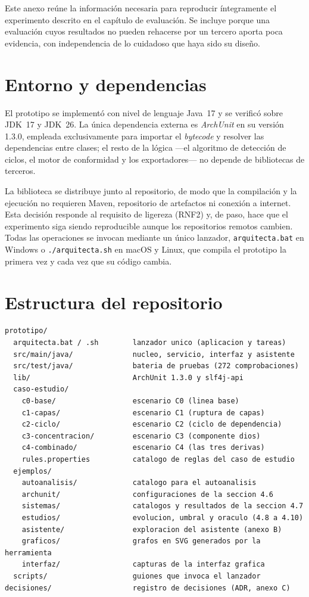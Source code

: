 \label{anexo:repro}

Este anexo reúne la información necesaria para reproducir íntegramente el experimento descrito en el capítulo de evaluación. Se incluye porque una evaluación cuyos resultados no pueden rehacerse por un tercero aporta poca evidencia, con independencia de lo cuidadoso que haya sido su diseño.

\section{Entorno y dependencias}
El prototipo se implementó con nivel de lenguaje Java~17 y se verificó sobre JDK~17 y JDK~26. La única dependencia externa es \textit{ArchUnit} en su versión 1.3.0, empleada exclusivamente para importar el \textit{bytecode} y resolver las dependencias entre clases; el resto de la lógica —el algoritmo de detección de ciclos, el motor de conformidad y los exportadores— no depende de bibliotecas de terceros.

La biblioteca se distribuye junto al repositorio, de modo que la compilación y la ejecución no requieren Maven, repositorio de artefactos ni conexión a internet. Esta decisión responde al requisito de ligereza (RNF2) y, de paso, hace que el experimento siga siendo reproducible aunque los repositorios remotos cambien. Todas las operaciones se invocan mediante un único lanzador, \texttt{arquitecta.bat} en Windows o \texttt{./arquitecta.sh} en macOS y Linux, que compila el prototipo la primera vez y cada vez que su código cambia.

\section{Estructura del repositorio}
\begin{verbatim}
prototipo/
  arquitecta.bat / .sh        lanzador unico (aplicacion y tareas)
  src/main/java/              nucleo, servicio, interfaz y asistente
  src/test/java/              bateria de pruebas (272 comprobaciones)
  lib/                        ArchUnit 1.3.0 y slf4j-api
  caso-estudio/
    c0-base/                  escenario C0 (linea base)
    c1-capas/                 escenario C1 (ruptura de capas)
    c2-ciclo/                 escenario C2 (ciclo de dependencia)
    c3-concentracion/         escenario C3 (componente dios)
    c4-combinado/             escenario C4 (las tres derivas)
    rules.properties          catalogo de reglas del caso de estudio
  ejemplos/
    autoanalisis/             catalogo para el autoanalisis
    archunit/                 configuraciones de la seccion 4.6
    sistemas/                 catalogos y resultados de la seccion 4.7
    estudios/                 evolucion, umbral y oraculo (4.8 a 4.10)
    asistente/                exploracion del asistente (anexo B)
    graficos/                 grafos en SVG generados por la herramienta
    interfaz/                 capturas de la interfaz grafica
  scripts/                    guiones que invoca el lanzador
decisiones/                   registro de decisiones (ADR, anexo C)
\end{verbatim}

